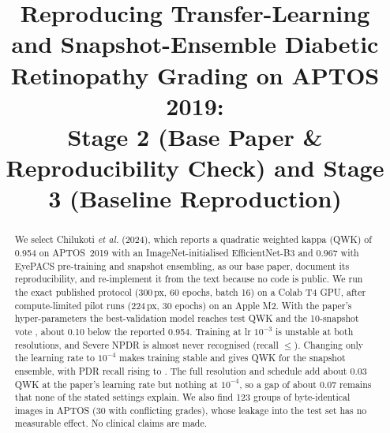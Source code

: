 \documentclass[conference]{IEEEtran}
\begin{document}
\title{Reproducing Transfer-Learning and Snapshot-Ensemble Diabetic Retinopathy Grading on APTOS 2019:\\
Stage 2 (Base Paper \& Reproducibility Check) and Stage 3 (Baseline Reproduction)}
\author{
}
\maketitle

\begin{abstract}
We select Chilukoti \emph{et al.} (2024), which reports a quadratic weighted kappa (QWK) of 0.954 on APTOS~2019
with an ImageNet-initialised EfficientNet-B3 and 0.967 with EyePACS pre-training and snapshot ensembling, as
our base paper, document its reproducibility, and re-implement it from the text because no code is public.
We run the exact published protocol (300\,px, 60 epochs, batch 16) on a Colab T4 GPU, after compute-limited
pilot runs (224\,px, 30 epochs) on an Apple M2. With the paper's hyper-parameters the best-validation model
reaches test QWK \FullBestQWK{} and the 10-snapshot vote \FullVoteQWK{}, about 0.10 below the reported 0.954.
Training at lr $10^{-3}$ is unstable at both resolutions, and Severe NPDR is almost never recognised (recall
$\leq$\FullBestSevRec{}). Changing only the learning rate to $10^{-4}$ makes training stable and gives QWK
\FulllowMeanQWK{} for the snapshot ensemble, with PDR recall rising to \FulllowMeanPDRRec{}. The full resolution
and schedule add about 0.03 QWK at the paper's learning rate but nothing at $10^{-4}$, so a gap of about 0.07
remains that none of the stated settings explain. We also find 123 groups of byte-identical images in APTOS
(30 with conflicting grades), whose leakage into the test set has no measurable effect. No clinical claims are made.
\end{abstract}






\end{document}
